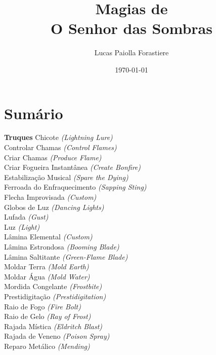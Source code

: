 \documentclass{RPG_Adventure}[2021/10/20]
\title{Magias de\\ \Huge{O Senhor das Sombras}}
\date{\today}
\author{Lucas Paiolla Forastiere}
\begin{document}
\maketitle

\chapter{Sumário}\n\n\noindent\textbf{Truques}
{\normalsize Chicote \textit{(Lightning Lure)}\\ }
{\normalsize Controlar Chamas \textit{(Control Flames)}\\ }
{\normalsize Criar Chamas \textit{(Produce Flame)}\\ }
{\normalsize Criar Fogueira Instantânea \textit{(Create Bonfire)}\\ }
{\normalsize Estabilização Musical \textit{(Spare the Dying)}\\ }
{\normalsize Ferroada do Enfraquecimento \textit{(Sapping Sting)}\\ }
{\normalsize Flecha Improvisada \textit{(Custom)}\\ }
{\normalsize Globos de Luz \textit{(Dancing Lights)}\\ }
{\normalsize Lufada \textit{(Gust)}\\ }
{\normalsize Luz \textit{(Light)}\\ }
{\normalsize Lâmina Elemental \textit{(Custom)}\\ }
{\normalsize Lâmina Estrondosa \textit{(Booming Blade)}\\ }
{\normalsize Lâmina Saltitante \textit{(Green-Flame Blade)}\\ }
{\normalsize Moldar Terra \textit{(Mold Earth)}\\ }
{\normalsize Moldar Água \textit{(Mold Water)}\\ }
{\normalsize Mordida Congelante \textit{(Frostbite)}\\ }
{\normalsize Prestidigitação \textit{(Prestidigitation)}\\ }
{\normalsize Raio de Fogo \textit{(Fire Bolt)}\\ }
{\normalsize Raio de Gelo \textit{(Ray of Frost)}\\ }
{\normalsize Rajada Mística \textit{(Eldritch Blast)}\\ }
{\normalsize Rajada de Veneno \textit{(Poison Spray)}\\ }
{\normalsize Reparo Metálico \textit{(Mending)}\\ }
\end{document}

